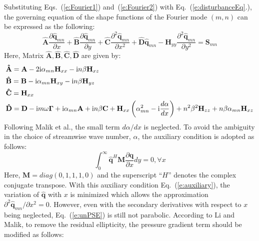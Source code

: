 \documentclass{AIAA}
\begin{document}
Substituting Eqs.~(\ref{e:Fourier1}) and~(\ref{e:Fourier2}) with Eq.~(\ref{e:disturbanceEq}.), the governing equation of the shape functions of the Fourier mode $(m,n)$ can be expressed as the following:
\begin{equation}
\label{e:unPSE}
    {\mathbf{\hat A}}\frac{{\partial {\mathbf{\hat q}}_{mn} }}{{\partial x}}
  + {\mathbf{\hat B}}\frac{{\partial {\mathbf{\hat q}}_{mn} }}{{\partial y}}
  + {\mathbf{\hat C}}\frac{{\partial^2 {\mathbf{\hat q}}_{mn} }}{{\partial x^2}}
  + {\mathbf{\hat D\hat q}}_{mn}
  - {\mathbf{H}}_{yy}\frac{{\partial ^2 {\mathbf{\hat q}}_{mn} }}{{\partial y^2 }}
  = {\mathbf{S}}_{mn}
\end{equation}
Here, Matrix ${\mathbf{\hat A}},{\mathbf{\hat B}},{\mathbf{\hat C}},{\mathbf{\hat D}}$ are given by:
\begin{equation}
\begin{gathered}
  \mathbf{\hat A}  = {\mathbf{A}} - 2{\rm i}\alpha_{mn}{\mathbf{H}}_{xx} - {\rm i}n\beta{\mathbf{H}}_{xz}  \hfill \\
  \mathbf{\hat B}  = {\mathbf{B}} -  {\rm i}\alpha_{mn}{\mathbf{H}}_{xy} - {\rm i}n\beta{\mathbf{H}}_{yz}   \hfill \\
  \mathbf{\hat C}  = {\mathbf{H}}_{xx} \hfill \\
  \mathbf{\hat D}  = {\mathbf{D}} - {\rm i}m\omega {\mathbf{\Gamma }} + {\rm i}\alpha_{mn} {\mathbf{A}} + {\rm i}n\beta {\mathbf{C}} + {\mathbf{H}}_{xx} \left( {\alpha_{mn}^2  - {\rm i}\frac{{d\alpha }}{dx}} \right) + n^2\beta ^2 {\mathbf{H}}_{zz} + n\beta\alpha_{mn}{\mathbf{H}}_{xz} \hfill \\
\end{gathered}
\end{equation}
Following Malik et al.\cite{Malik1999}, the small term ${{d\alpha }}/{dx}$ is neglected. To avoid the ambiguity in the choice of streamwise wave number, $\alpha$, the auxiliary condition is adopted as follows:
\begin{equation}
\label{e:auxiliary}
    \int_0^\infty  {{\mathbf{\hat q}}^H {\mathbf{M}}\frac{{\partial {\mathbf{\hat q}}}}{{\partial x}}dy}  = 0,\forall x
\end{equation}
Here, $\mathbf{M}=diag(0,1,1,1,0)$ and the superscript ``$H$'' denotes the complex conjugate transpose. With this auxiliary condition Eq.~(\ref{e:auxiliary}), the variation of $\mathbf{\hat q}$ with $x$ is minimized\cite{Malik1994} which allows the approximation ${{\partial ^2 {\mathbf{\hat q}}_{mn} }}/{{\partial x^2 }}=0$. However, even with the secondary derivatives with respect to $x$ being neglected, Eq.~(\ref{e:unPSE}) is still not parabolic. According to Li and Malik\cite{LiMalik1996}, to remove the residual ellipticity, the pressure gradient term should be modified as follows:
\end{document}
